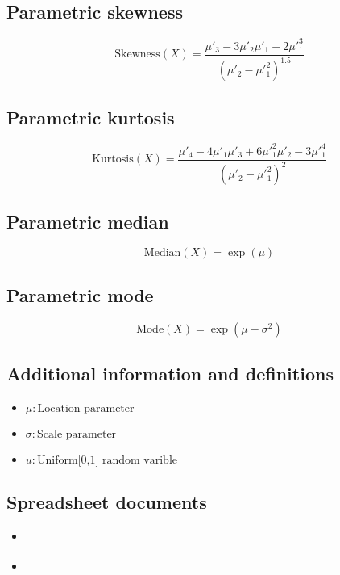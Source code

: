 \documentclass{article}
\begin{document}
\subsection{Parametric skewness}
\begin{equation*} \mathrm{Skewness}(X)=\frac{\mu'_{3}-3\mu'_{2}\mu'_{1}+2\mu'^{3}_{1}}{(\mu'_{2}-\mu'^{2}_{1})^{1.5}} \end{equation*}
\subsection{Parametric kurtosis}
\begin{equation*} \mathrm{Kurtosis}(X)=\frac{\mu'_{4}-4\mu'_{1}\mu'_{3}+6\mu'^{2}_{1}\mu'_{2}-3\mu'^{4}_{1}}{(\mu'_{2}-\mu'^{2}_{1})^{2}} \end{equation*}
\subsection{Parametric median}
\begin{equation*} \mathrm{Median}(X)=\exp(\mu) \end{equation*}
\subsection{Parametric mode}
\begin{equation*} \mathrm{Mode}(X)=\exp(\mu-\sigma^2) \end{equation*}
\subsection{Additional information and definitions}
\begin{itemize}
    \item $ \mu:\text{Location parameter} $
    \item $ \sigma:\text{Scale parameter} $
    \item $ u:\text{Uniform[0,1] random varible} $
\end{itemize}
\subsection{Spreadsheet documents}
\begin{itemize}
    \item \href{https://github.com/phitterio/phitter-files/blob/main/continuous/lognormal.xlsx}{\color{teal}{Excel file from GitHub repository}}
    \item \href{https://docs.google.com/spreadsheets/d/1lS1cR4C2R45ug0ZyLxBlRBtcXH6hNPE1L-5wP68gUpA}{\color{teal}{Google spreadsheet document}}
\end{itemize}
\end{document}
